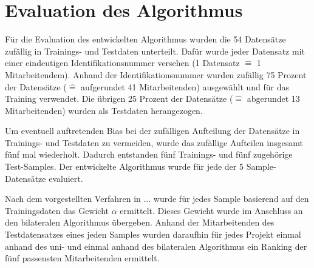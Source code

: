 

\section{Evaluation des Algorithmus}
Für die Evaluation des entwickelten Algorithmus wurden die 54 Datensätze zufällig in Trainings- und Testdaten unterteilt.
Dafür wurde jeder Datensatz mit einer eindeutigen Identifikationsnummer versehen (1 Datensatz $\hat{=}$ 1 Mitarbeitendem).
Anhand der Identifikationsnummer wurden zufällig 75 Prozent der Datensätze ($\hat{=}$ aufgerundet 41 Mitarbeitenden) ausgewählt und für das Training verwendet.
Die übrigen 25 Prozent der Datensätze ($\hat{=}$ abgerundet 13 Mitarbeitenden) wurden als Testdaten herangezogen.

Um eventuell auftretenden Bias bei der zufälligen Aufteilung der Datensätze in Trainings- und Testdaten zu vermeiden, wurde das zufällige Aufteilen insgesamt fünf mal wiederholt.
Dadurch entstanden fünf Trainings- und fünf zugehörige Test-Samples.
Der entwickelte Algorithmus wurde für jede der 5 Sample-Datensätze evaluiert.

Nach dem vorgestellten Verfahren in ... wurde für jedes Sample basierend auf den Trainingsdaten das Gewicht $\alpha$ ermittelt.
Dieses Gewicht wurde im Anschluss an den bilateralen Algorithmus übergeben.
Anhand der Mitarbeitenden des Testdatensatzes eines jeden Samples wurden daraufhin für jedes Projekt einmal anhand des uni- und einmal anhand des bilateralen Algorithmus ein Ranking der fünf passensten Mitarbeitenden ermittelt.

